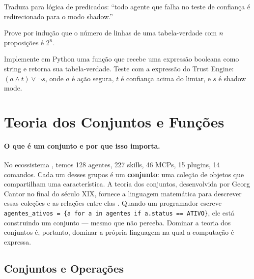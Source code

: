 \begin{exercicio}
    Traduza para lógica de predicados: ``todo agente que falha no teste de
    confiança é redirecionado para o modo shadow.''
\end{exercicio}

\begin{exercicio}
    Prove por indução que o número de linhas de uma tabela-verdade com $n$
    proposições é $2^n$.
\end{exercicio}

\begin{exercicio}
    Implemente em Python uma função que recebe uma expressão booleana como
    string e retorna sua tabela-verdade. Teste com a expressão do Trust
    Engine: $(a \land t) \lor \neg s$, onde $a$ é ação segura, $t$ é
    confiança acima do limiar, e $s$ é shadow mode.
\end{exercicio}

\section{Teoria dos Conjuntos e Funções}
\label{sec:teoria-conjuntos}
\nivelbasico

\paragraph{O que é um conjunto e por que isso importa.} No ecossistema
\opencodeeco{}, temos 128 agentes, 227 skills, 46 MCPs, 15 plugins, 14
comandos. Cada um desses grupos é um \textbf{conjunto}: uma coleção de
objetos que compartilham uma característica. A teoria dos conjuntos,
desenvolvida por Georg Cantor no final do século XIX, fornece a linguagem
matemática para descrever essas coleções e as relações entre elas
\cite{hastie2009elements, wasserman2004all}. Quando um programador escreve
    \lstinline|agentes_ativos = {a for a in agentes if a.status == ATIVO}|, ele
está construindo um conjunto --- mesmo que não perceba. Dominar a teoria dos
conjuntos é, portanto, dominar a própria linguagem na qual a computação é
expressa.

\subsection{Conjuntos e Operações}

